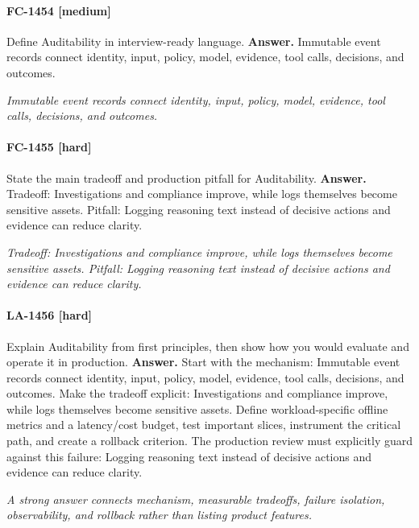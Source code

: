 \paragraph{FC-1454 [medium]} Define Auditability in interview-ready language.
\noindent\textbf{Answer.} Immutable event records connect identity, input, policy, model, evidence, tool calls, decisions, and outcomes.
\par\textit{Immutable event records connect identity, input, policy, model, evidence, tool calls, decisions, and outcomes.}
\paragraph{FC-1455 [hard]} State the main tradeoff and production pitfall for Auditability.
\noindent\textbf{Answer.} Tradeoff: Investigations and compliance improve, while logs themselves become sensitive assets. Pitfall: Logging reasoning text instead of decisive actions and evidence can reduce clarity.
\par\textit{Tradeoff: Investigations and compliance improve, while logs themselves become sensitive assets. Pitfall: Logging reasoning text instead of decisive actions and evidence can reduce clarity.}
\paragraph{LA-1456 [hard]} Explain Auditability from first principles, then show how you would evaluate and operate it in production.
\noindent\textbf{Answer.} Start with the mechanism: Immutable event records connect identity, input, policy, model, evidence, tool calls, decisions, and outcomes. Make the tradeoff explicit: Investigations and compliance improve, while logs themselves become sensitive assets. Define workload-specific offline metrics and a latency/cost budget, test important slices, instrument the critical path, and create a rollback criterion. The production review must explicitly guard against this failure: Logging reasoning text instead of decisive actions and evidence can reduce clarity.
\par\textit{A strong answer connects mechanism, measurable tradeoffs, failure isolation, observability, and rollback rather than listing product features.}
